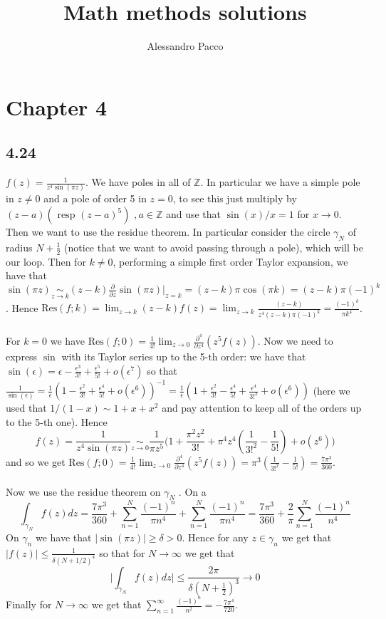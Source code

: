 \documentclass[10pt,a4paper]{book}
\author{Alessandro Pacco}
\title{Math methods solutions}
\newcommand{\p}{\partial}
\newcommand{\res}{\text{Res}}
\begin{document}
 
\maketitle


\chapter*{Chapter 4}
\section*{4.24}

$f(z)=\frac{1}{z^4\sin(\pi z)}$. We have poles in all of $\mathbb{Z}$. In particular we have a simple pole in $z\neq 0$ and a pole of order 5 in $z=0$, to see this just multiply by $(z-a) (\text{ resp } (z-a)^5)\,\,, a\in\mathbb{Z}$ and use that $\sin(x)/x=1$ for $x\to 0$. Then we want to use the residue theorem. In particular consider the circle $\gamma_N$ of radius $N+\frac{1}{2}$ (notice that we want to avoid passing through a pole), which will be our loop.
Then for $k\neq 0$, performing a simple first order Taylor expansion, we have that $\sin(\pi z)\underset{z\to k}{\sim} (z-k)\frac{\partial }{\partial z}\sin(\pi z)|_{z=k}=(z-k)\pi\cos(\pi k)=(z-k)\pi(-1)^k$. Hence $\res(f;k)=\lim_{z\to k }(z-k)f(z)=\lim_{z\to k} \frac{(z-k)}{z^4(z-k)\pi(-1)^k} =\frac{(-1)^k}{\pi k^4}$. \\\\
For $k=0$ we have $\res(f;0)=\frac{1}{4!}\lim_{z\to 0}\frac{\p^4}{\p z^4}(z^5 f(z))$. Now we need to express $\sin$ with its Taylor series up to the 5-th order: we have that $\sin(\epsilon)=\epsilon -\frac{\epsilon^3}{3!}+\frac{\epsilon^5}{5!}+o(\epsilon^7)$ so that $\frac{1}{\sin(\epsilon)}=\frac{1}{\epsilon}(1-\frac{\epsilon^2}{3!}+\frac{\epsilon^4}{5!}+o(\epsilon^6))^{-1}=\frac{1}{\epsilon}(1+\frac{\epsilon^2}{3!}-\frac{\epsilon^4}{5!}+\frac{\epsilon^4}{3!^2}+o(\epsilon^6))$ (here we used that $1/(1-x)\sim 1+x+x^2$ and pay attention to keep all of the orders up to the 5-th one). Hence 
\[
f(z)=\frac{1}{z^4\sin(\pi z)}\underset{z\to 0}{\sim}\frac{1}{\pi z^5}\bigg(1+\frac{\pi^2 z^2}{3!}+\pi^4 z^4(\frac{1}{3!^2}-\frac{1}{5!})+o(z^6)\bigg)
\]
and so we get $\res(f;0)=\frac{1}{4!}\lim_{z\to0}\frac{\partial^4}{\partial z^4} (z^5f(z))=\pi^3(\frac{1}{3!^2}-\frac{1}{5!})=\frac{7\pi^3}{360}$.\\\\
Now we use the residue theorem on $\gamma_N$ . On a
$$\int_{\gamma_N}f(z)dz=\frac{7\pi^3}{360}+\sum_{n=1}^{N} \frac{(-1)^n}{\pi n^4}+\sum_{n=1}^N\frac{(-1)^n}{\pi n^4}=\frac{7\pi^3}{360}+\frac{2}{\pi}\sum_{n=1}^N \frac{(-1)^n}{ n^4}$$
On $\gamma_n$ we have that $|\sin(\pi z)|\geq \delta >0$. Hence for any $z\in\gamma_n$ we get that $|f(z)|\leq \frac{1}{\delta(N+1/2)^4}$ so that for $N\to \infty$ we get that 
$$\bigg|\int_{\gamma_N}f(z)dz\bigg|\leq \frac{2\pi}{\delta(N+\frac{1}{2})^3}\to 0$$
Finally for $N\to \infty$ we get that $\sum_{n=1}^{\infty}\frac{(-1)^n}{n^2}=-\frac{7\pi^4}{720}$. 
\end{document}
